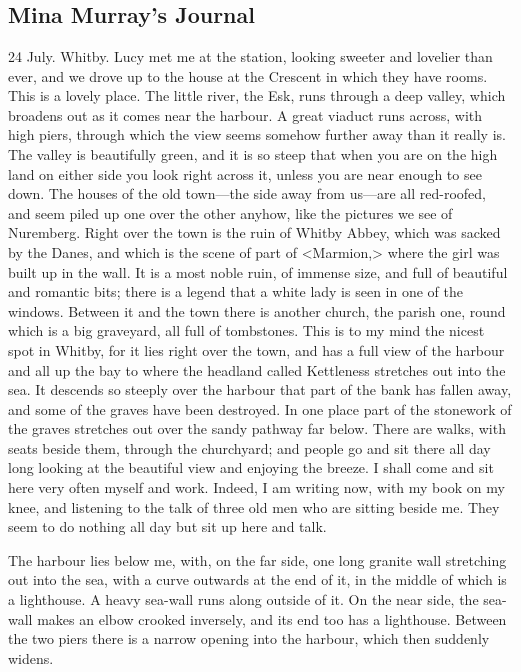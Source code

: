 \chapter[Chapter \thechapter]{}

\section{Mina Murray's Journal}

\begin{diary}{24 July. Whitby.}
Lucy met me at the station, looking sweeter and lovelier than ever, and we drove up to the house at the Crescent in which they have rooms. This is a lovely place. The little river, the Esk, runs through a deep valley, which broadens out as it comes near the harbour. A great viaduct runs across, with high piers, through which the view seems somehow further away than it really is. The valley is beautifully green, and it is so steep that when you are on the high land on either side you look right across it, unless you are near enough to see down. The houses of the old town—the side away from us—are all red-roofed, and seem piled up one over the other anyhow, like the pictures we see of Nuremberg. Right over the town is the ruin of Whitby Abbey, which was sacked by the Danes, and which is the scene of part of <Marmion,> where the girl was built up in the wall. It is a most noble ruin, of immense size, and full of beautiful and romantic bits; there is a legend that a white lady is seen in one of the windows. Between it and the town there is another church, the parish one, round which is a big graveyard, all full of tombstones. This is to my mind the nicest spot in Whitby, for it lies right over the town, and has a full view of the harbour and all up the bay to where the headland called Kettleness stretches out into the sea. It descends so steeply over the harbour that part of the bank has fallen away, and some of the graves have been destroyed. In one place part of the stonework of the graves stretches out over the sandy pathway far below. There are walks, with seats beside them, through the churchyard; and people go and sit there all day long looking at the beautiful view and enjoying the breeze. I shall come and sit here very often myself and work. Indeed, I am writing now, with my book on my knee, and listening to the talk of three old men who are sitting beside me. They seem to do nothing all day but sit up here and talk.

The harbour lies below me, with, on the far side, one long granite wall stretching out into the sea, with a curve outwards at the end of it, in the middle of which is a lighthouse. A heavy sea-wall runs along outside of it. On the near side, the sea-wall makes an elbow crooked inversely, and its end too has a lighthouse. Between the two piers there is a narrow opening into the harbour, which then suddenly widens.


\end{diary}
